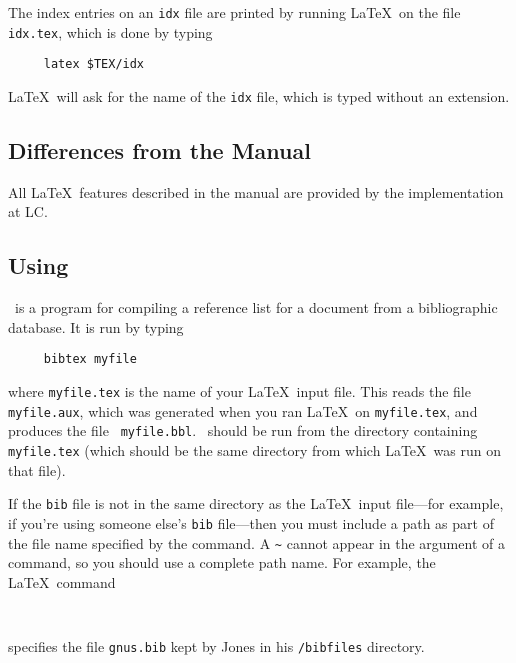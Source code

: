 The index entries on an {\tt idx} file are printed by running \LaTeX\
on the file \mbox{\tt idx.tex}, which is done by typing
\begin{verbatim}
     latex $TEX/idx
\end{verbatim}
\LaTeX\ will ask for the name of the {\tt idx} file, which is typed
without an extension.



\subsection{Differences from the Manual}

All \LaTeX\ features described in the manual are provided by 
the implementation at LC.





\subsection{Using \BibTeX}

\BibTeX\ is a program for compiling a reference list for a document
from a bibliographic database.  It is run by typing
\begin{verbatim}
     bibtex myfile
\end{verbatim}
where \mbox{\tt myfile.tex} is the name of your \LaTeX\ input file.
This reads the file \mbox{\tt myfile.aux}, which was generated when you
ran \LaTeX\ on \mbox{\tt myfile.tex}, and produces the file \mbox{\tt
myfile.bbl}.  \BibTeX\ should be run from the directory containing
\mbox{\tt myfile.tex} (which should be the same directory from which
\LaTeX\ was run on that file).

If the {\tt bib} file is not in the same directory as the \LaTeX\ input
file---for example, if you're using someone else's {\tt bib}
file---then you must include a path as part of the file name specified
by the \hbox{\verb||} command.  A \verb|~| cannot appear
in the argument of a \hbox{\verb||} command, so you should
use a complete path name.  For example, the \LaTeX\ command
\begin{verbatim}
     
\end{verbatim}
specifies the file \mbox{\tt gnus.bib} kept by Jones in his 
\mbox{\tt /bibfiles} directory.


